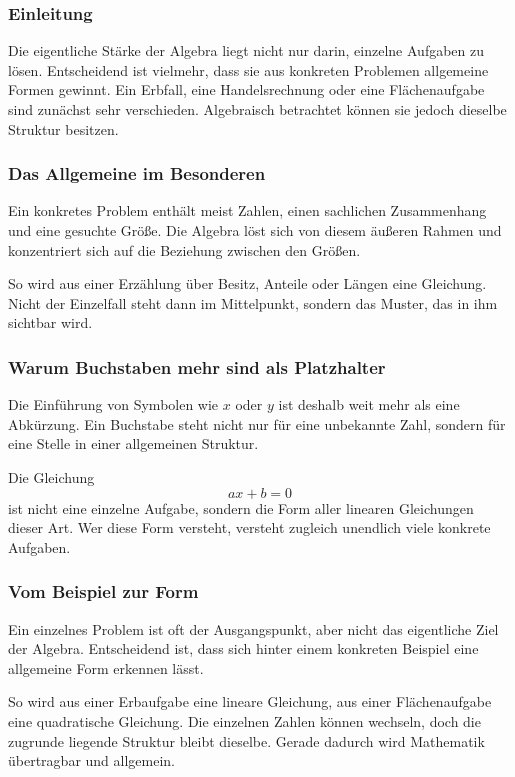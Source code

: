 \subsubsection*{Einleitung}
Die eigentliche Stärke der Algebra liegt nicht nur darin,
einzelne Aufgaben zu lösen.
Entscheidend ist vielmehr,
dass sie aus konkreten Problemen allgemeine Formen gewinnt.
Ein Erbfall, eine Handelsrechnung oder eine Flächenaufgabe
sind zunächst sehr verschieden.
Algebraisch betrachtet können sie jedoch dieselbe Struktur besitzen.

\subsubsection*{Das Allgemeine im Besonderen}
Ein konkretes Problem enthält meist Zahlen,
einen sachlichen Zusammenhang und eine gesuchte Größe.
Die Algebra löst sich von diesem äußeren Rahmen
und konzentriert sich auf die Beziehung zwischen den Größen.

So wird aus einer Erzählung über Besitz, Anteile oder Längen
eine Gleichung.
Nicht der Einzelfall steht dann im Mittelpunkt,
sondern das Muster, das in ihm sichtbar wird.

\subsubsection*{Warum Buchstaben mehr sind als Platzhalter}
Die Einführung von Symbolen wie \(x\) oder \(y\)
ist deshalb weit mehr als eine Abkürzung.
Ein Buchstabe steht nicht nur für eine unbekannte Zahl,
sondern für eine Stelle in einer allgemeinen Struktur.

Die Gleichung
\[
ax+b=0
\]
ist nicht eine einzelne Aufgabe,
sondern die Form aller linearen Gleichungen dieser Art.
Wer diese Form versteht,
versteht zugleich unendlich viele konkrete Aufgaben.

\subsubsection*{Vom Beispiel zur Form}
Ein einzelnes Problem ist oft der Ausgangspunkt,
aber nicht das eigentliche Ziel der Algebra.
Entscheidend ist,
dass sich hinter einem konkreten Beispiel
eine allgemeine Form erkennen lässt.

So wird aus einer Erbaufgabe eine lineare Gleichung,
aus einer Flächenaufgabe eine quadratische Gleichung.
Die einzelnen Zahlen können wechseln,
doch die zugrunde liegende Struktur bleibt dieselbe.
Gerade dadurch wird Mathematik übertragbar und allgemein.

